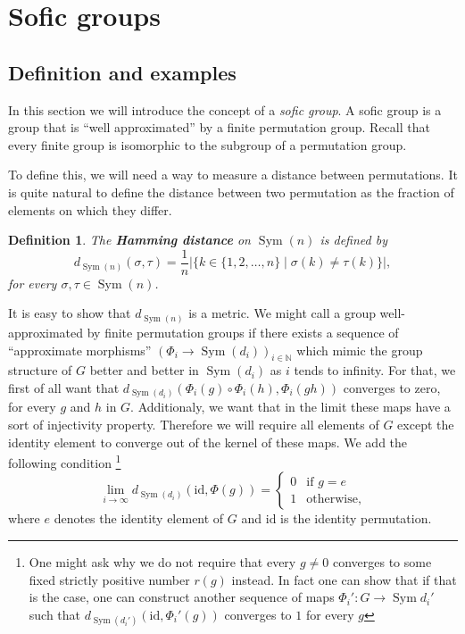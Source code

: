 \documentclass[titlepage, a4paper]{article}
\newcommand{\N}{\mathbb{N}}
\newcommand{\card}[1]{\left| #1 \right|}
\newcommand{\id}{\mathrm{id}}
\DeclareMathOperator{\sym}{Sym}
\newtheorem{definition}[theorem]{Definition}
\theoremstyle{remark}
\begin{document}
\section{Sofic groups}\label{sec:sofic_group}

\subsection{Definition and examples}

In this section we will introduce the concept of a \emph{sofic group}. A sofic group is a group that is ``well approximated'' by a finite permutation group. Recall that every finite group is isomorphic to the subgroup of a permutation group.

To define this, we will need a way to measure a distance between permutations. It is quite natural to define the distance between two permutation as the fraction of elements on which they differ.

\begin{definition} %
    The \textbf{Hamming distance} on $\sym(n)$ is defined by
    \[
        d_{\sym(n)}(\sigma, \tau) = \frac 1 n \card{\{k \in \{1, 2, \dots,n\} \mid \sigma(k) \neq \tau(k)\}}, 
    \]
    for every $\sigma, \tau \in \sym(n)$.
\end{definition}

It is easy to show that $d_{\sym(n)}$ is a metric.
We might call a group well-approximated by finite permutation groups if there exists a sequence of ``approximate morphisms''
$(\Phi_i \to \sym(d_i))_{i \in \N}$  %
which mimic the group structure of $G$ better and better in $\sym(d_i)$ as $i$ tends to infinity. %
For that, we first of all want that $d_{\sym(d_i)}(\Phi_i(g) \circ \Phi_i(h), \Phi_i(gh))$ converges to zero, for every $g$ and $h$ in $G$. Additionaly, we want that in the limit these maps have a sort of injectivity property. Therefore we will require all elements of $G$ except the identity element to converge out of the kernel of these maps. We add the following condition  \footnote{One might ask why we do not require that every $g \neq 0$ converges to some fixed strictly positive number $r(g)$ instead. In fact one can show that if that is the case, one can construct another sequence of maps $\Phi_i' : G \to \sym{d_i'}$ such that $d_{\sym(d_i')}(\id, \Phi_i'(g))$ converges to $1$ for every $g$}
\[
\lim_{i \to \infty} d_{\sym(d_i)}(\id,\Phi(g)) = \begin{cases}  0 & \text{if } g = e \\
                                        1 & \text{otherwise,}
                                        \end{cases}
\]
where $e$ denotes the identity element of $G$ and $\id$ is the identity permutation.
\end{document}
